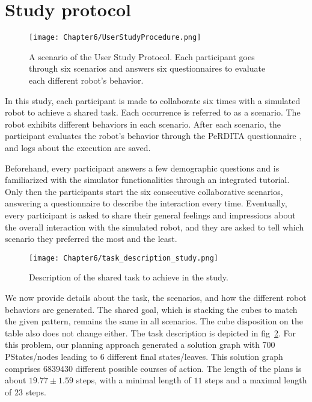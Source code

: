 \section{Study protocol} \label{sec:study_protocol}

\begin{figure}
    \centering
    \texttt{[image: Chapter6/UserStudyProcedure.png]}
    \caption{A scenario of the User Study Protocol. Each participant goes through six scenarios and answers six questionnaires to evaluate each different robot's behavior.}
    \label{fig:user_study_protocol}
\end{figure}


In this study, each participant is made to collaborate six times with a simulated robot to achieve a shared task. Each occurrence is referred to as a scenario. The robot exhibits different behaviors in each scenario. After each scenario, the participant evaluates the robot's behavior through the PeRDITA questionnaire \cite{devin_evaluating_2018}, and logs about the execution are saved.

Beforehand, every participant answers a few demographic questions and is familiarized with the simulator functionalities through an integrated tutorial. Only then the participants start the six consecutive collaborative scenarios, answering a questionnaire to describe the interaction every time. Eventually, every participant is asked to share their general feelings and impressions about the overall interaction with the simulated robot, and they are asked to tell which scenario they preferred the most and the least.

\begin{figure}
    \centering
    \texttt{[image: Chapter6/task\_description\_study.png]}
    \caption{Description of the shared task to achieve in the study.}
    \label{fig:task_description_study}
\end{figure}

We now provide details about the task, the scenarios, and how the different robot behaviors are generated. 
The shared goal, which is stacking the cubes to match the given pattern, remains the same in all scenarios. The cube disposition on the table also does not change either. The task description is depicted in fig~\ref{fig:task_description_study}. For this problem, our planning approach generated a solution graph with 700 PStates/nodes leading to 6 different final states/leaves. This solution graph comprises $6839430$ different possible courses of action. The length of the plans is about $19.77 \pm 1.59$ steps, with a minimal length of $11$ steps and a maximal length of $23$ steps.


